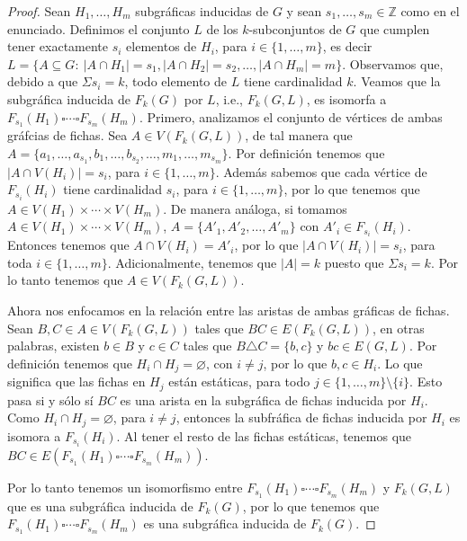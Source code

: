 \begin{proof}
    Sean $H_1, \dots, H_m$ subgr\'aficas inducidas de  $G$ y sean $s_1,
    \dots, s_m \in \mathbb{Z}$ como en el enunciado. Definimos el
    conjunto $L$ de los $k$-subconjuntos de $G$ que cumplen tener
    exactamente $s_i$ elementos de $H_i$, para $i \in \{1, \dots, m\}$,
    es decir $L = \{A \subseteq G \colon\ |A\cap H_1|=s_1 , |A \cap
    H_2|=s_2, \dots, |A \cap H_m|=m \}$. Observamos que, debido a  que
    $\Sigma s_i = k$, todo elemento de $L$ tiene cardinalidad $k$.
    Veamos que la subgr\'afica inducida de $F_k(G)$ por $L$, i.e., $F_k(G,L)$,
    es isomorfa a $F_{s_1}(H_1) \square \cdots \square F_{s_m}(H_m)$.
    Primero, analizamos el conjunto de v\'ertices de ambas
    gr\'afcias de fichas. Sea $A \in V(F_k(G,L))$, de tal manera que $A=\{a_1,
    \dots, a_{s_1}, b_1,\dots, b_{s_2}, \dots, m_1, \dots, m_{s_m}\}$.
    Por definici\'on tenemos que $|A \cap V(H_i)|= s_i$, para $i \in
    \{1, \dots, m\}$. Adem\'as sabemos que cada v\'ertice de
    $F_{s_i}(H_i)$ tiene cardinalidad $s_i$, para $i \in \{1, \dots,
    m\}$, por lo que tenemos que $A \in V(H_1) \times \cdots \times
    V(H_m)$. De manera an\'aloga, si tomamos $A \in V(H_1) \times \cdots
    \times V(H_m)$, $A = \{A'_1, A'_2, \dots, A'_m\}$ con $A'_i \in
    F_{s_i}(H_i)$. Entonces tenemos que $A \cap V(H_i) = A'_i$, por lo
    que $|A \cap V(H_i)|= s_i$, para toda $i \in \{1, \dots, m\}$.
    Adicionalmente, tenemos que $|A|= k$ puesto que $\Sigma s_i = k$.
    Por lo tanto tenemos que $A \in V(F_k(G,L))$.

    Ahora nos enfocamos en la relaci\'on entre las aristas de ambas
    gr\'aficas de fichas. Sean $B, C \in A \in V(F_k(G,L))$ tales que
    $BC \in E(F_k(G,L))$, en otras palabras, existen $b \in B$ y $c \in
    C$ tales que $B \triangle C = \{b, c\}$ y $bc \in E(G,L)$. Por
    definici\'on tenemos que $H_i \cap H_j = \varnothing$, con $i \neq
    j$, por lo que $b, c \in H_i$. Lo que significa que las fichas en
    $H_j$ est\'an est\'aticas, para todo $j \in \{1, \dots, m\} \setminus
    \{i\}$. Esto pasa si y s\'olo s\'i $BC$ es una arista en la
    subgr\'afica de fichas inducida por $H_i$. Como $H_i \cap H_j =
    \varnothing$, para $i \neq j$, entonces la subfr\'afica de fichas
    inducida por $H_i$ es isomora a $F_{s_i}(H_i)$. Al tener el resto de
    las fichas est\'aticas, tenemos que $BC \in E(F_{s_1}(H_1) \square
    \cdots \square F_{s_m}(H_m))$.

    Por lo tanto tenemos un isomorfismo entre $F_{s_1}(H_1) \square
    \cdots \square F_{s_m}(H_m)$ y $F_k(G,L)$ que es una subgr\'afica
    inducida de $F_k(G)$, por lo que tenemos que $F_{s_1}(H_1) \square
    \cdots \square F_{s_m}(H_m)$ es una subgr\'afica inducida de
    $F_k(G)$.
\end{proof}

